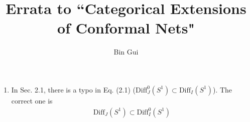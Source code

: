 \documentclass[11pt,b5paper,notitlepage]{article}
\title{Errata to ``Categorical Extensions of Conformal Nets"}
\author{Bin Gui}
\begin{document}
\sloppy

\maketitle


\begin{enumerate}
\item In Sec. 2.1, there is a typo in Eq. (2.1) ($\mathrm{Diff}^0_J(S^1)\subset\mathrm{Diff}_I(S^1)$). The correct one is
\begin{align*}
\mathrm{Diff}_J(S^1)\subset\mathrm{Diff}^0_I(S^1)\tag{2.1}
\end{align*} 
\end{enumerate}
\end{document}
